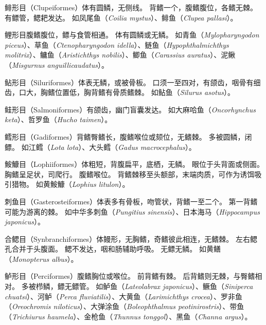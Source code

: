\documentclass[11pt]{article}
\begin{document}
鲱形目（Clupeiformes）体有圆鳞，无侧线。
背鳍一个，腹鳍腹位，各鳍无棘。
有鳔管，鳃耙发达。
如凤尾鱼（\textit{Coilia mystus}）、鲱鱼（\textit{Clupea pallasi}）。

\newline

鲤形目腹鳍腹位，鳔与食管相通。
体有圆鳞或无鳞。
如青鱼（\textit{Mylopharyngodon piceus}）、草鱼（\textit{Ctenopharyngodon idella}）、鲢鱼（\textit{Hypophthalmichthys molitrix}）、鳙鱼（\textit{Aristichthys nobilis}）、鲫鱼（\textit{Carassius auratus}）、泥鳅（\textit{Misgurnus anguillicaudatus}）。

\newline

鲇形目（Siluriformes）体表无鳞，或被骨板。
口须一至四对，有颌齿，咽骨有细齿，口大，胸鳍位置低，胸背鳍有骨质鳍棘。
如鲇鱼（\textit{Silurus asotus}）。

\newline

鲑形目（Salmoniformes）有颌齿，幽门盲囊发达。
如大麻哈鱼（\textit{Oncorhynchus keta}）、哲罗鱼（\textit{Hucho taimen}）。

\newline

鳕形目（Gadiformes）背鳍臀鳍长，腹鳍喉位或颏位，无鳍棘。
多被圆鳞，闭鳔。
如江鳕（\textit{Lota lota}）、大头鳕（\textit{Gadus macrocephalus}）。

\newline

鮟鱇目（Lophiiformes）体粗短，背腹扁平，底栖，无鳞。
眼位于头背面或侧面。
胸鳍呈足状，司爬行。
腹鳍喉位。
背鳍棘移至头额部，末端肉质，可作为诱饵吸引猎物。
如黄鮟鱇（\textit{Lophius litulon}）。

\newline

刺鱼目（Gasterosteiformes）体表多有骨板，吻管状，背鳍一至二个。
第一背鳍可能为游离的棘。
如中华多刺鱼（\textit{Pungitius sinensis}）、日本海马（\textit{Hippocampus japonicus}）。

\newline

合鳃目（Synbranchiformes）体鳗形，无胸鳍，奇鳍彼此相连，无鳍棘。
左右鳃孔合并于头腹面。
鳃不发达，咽和肠辅助呼吸。
无鳔无鳞。
如黄鳝（\textit{Monopterus albus}）。

\newline

鲈形目（Perciformes）腹鳍胸位或喉位。
前背鳍有棘。
后背鳍则无棘，与臀鳍相对。
多被栉鳞，鳔无鳔管。
如鲈鱼（\textit{Lateolabrax japonicus}）、鳜鱼（\textit{Siniperca chuatsi}）、河鲈（\textit{Perca fluviatilis}）、大黄鱼（\textit{Larimichthys crocea}）、罗非鱼（\textit{Oreochromis niloticus}）、大弹涂鱼（\textit{Boleophthalmus peotinirostris}）、带鱼（\textit{Trichiurus haumela}）、金枪鱼（\textit{Thunnus tonggol}）、黑鱼（\textit{Channa argus}）。
\end{document}
